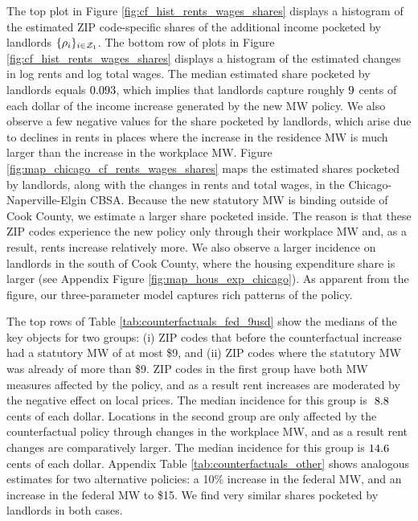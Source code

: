 The top plot in Figure \ref{fig:cf_hist_rents_wages_shares} displays a histogram 
of the estimated ZIP code-specific shares of the additional income pocketed by 
landlords $\{\rho_i\}_{i\in\mathcal{Z}_1}$.
The bottom row of plots in Figure \ref{fig:cf_hist_rents_wages_shares} displays 
a histogram of the estimated changes in log rents and log total wages.
The median estimated share pocketed by landlords equals $\textnormal{0.093}$, 
which implies that landlords capture roughly $\textnormal{9}$ cents of 
each dollar of the income increase generated by the new MW policy.
We also observe a few negative values for the share pocketed by landlords, which
arise due to declines in rents in places where the increase in the residence MW
is much larger than the increase in the workplace MW.
Figure \ref{fig:map_chicago_cf_rents_wages_shares} maps the estimated shares 
pocketed by landlords, along with the changes in rents and total wages, in the 
Chicago-Naperville-Elgin CBSA.
Because the new statutory MW is binding outside of Cook County, we estimate 
a larger share pocketed inside.
The reason is that these ZIP codes experience the new policy only through
their workplace MW and, as a result, rents increase relatively more.
We also observe a larger incidence on landlords in the south of Cook County,
where the housing expenditure share is larger 
(see Appendix Figure \ref{fig:map_hous_exp_chicago}).
As apparent from the figure, our three-parameter model captures rich patterns
of the policy.

The top rows of Table \ref{tab:counterfactuals_fed_9usd} show the medians of 
the key objects for two groups: 
(i) ZIP codes that before the counterfactual increase had a statutory MW of 
at most \$9, and 
(ii) ZIP codes where the statutory MW was already of more than \$9.
ZIP codes in the first group have both MW measures affected by the policy,
and as a result rent increases are moderated by the negative effect on local
prices.
The median incidence for this group is $\textnormal{ 8.8}$ cents of each 
dollar.
Locations in the second group are only affected by the counterfactual policy 
through changes in the workplace MW, and as a result rent changes are 
comparatively larger.
The median incidence for this group is $\textnormal{14.6}$ cents of each 
dollar.
Appendix Table \ref{tab:counterfactuals_other} shows analogous estimates for
two alternative policies: a 10\% increase in the federal MW, and an increase
in the federal MW to \$15.
We find very similar shares pocketed by landlords in both cases.

